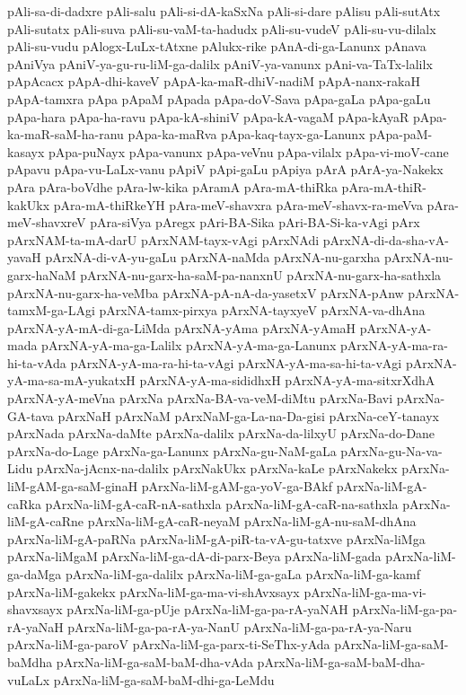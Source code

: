{pAli-sa-di-dadxre
pAli-salu
pAli-si-dA-kaSxNa
pAli-si-dare
pAlisu
pAli-sutAtx
pAli-sutatx
pAli-suva
pAli-su-vaM-ta-hadudx
pAli-su-vudeV
pAli-su-vu-dilalx
pAli-su-vudu
pAlogx-LuLx-tAtxne
pAlukx-rike
pAnA-di-ga-Lanunx
pAnava
pAniVya
pAniV-ya-gu-ru-liM-ga-dalilx
pAniV-ya-vanunx
pAni-va-TaTx-lalilx
pApAcacx
pApA-dhi-kaveV
pApA-ka-maR-dhiV-nadiM
pApA-nanx-rakaH
pApA-tamxra
pApa
pApaM
pApada
pApa-doV-Sava
pApa-gaLa
pApa-gaLu
pApa-hara
pApa-ha-ravu
pApa-kA-shiniV
pApa-kA-vagaM
pApa-kAyaR
pApa-ka-maR-saM-ha-ranu
pApa-ka-maRva
pApa-kaq-tayx-ga-Lanunx
pApa-paM-kasayx
pApa-puNayx
pApa-vanunx
pApa-veVnu
pApa-vilalx
pApa-vi-moV-cane
pApavu
pApa-vu-LaLx-vanu
pApiV
pApi-gaLu
pApiya
pArA
pArA-ya-Nakekx
pAra
pAra-boVdhe
pAra-lw-kika
pAramA
pAra-mA-thiRka
pAra-mA-thiR-kakUkx
pAra-mA-thiRkeYH
pAra-meV-shavxra
pAra-meV-shavx-ra-meVva
pAra-meV-shavxreV
pAra-siVya
pAregx
pAri-BA-Sika
pAri-BA-Si-ka-vAgi
pArx
pArxNAM-ta-mA-darU
pArxNAM-tayx-vAgi
pArxNAdi
pArxNA-di-da-sha-vA-yavaH
pArxNA-di-vA-yu-gaLu
pArxNA-naMda
pArxNA-nu-garxha
pArxNA-nu-garx-haNaM
pArxNA-nu-garx-ha-saM-pa-nanxnU
pArxNA-nu-garx-ha-sathxla
pArxNA-nu-garx-ha-veMba
pArxNA-pA-nA-da-yasetxV
pArxNA-pAnw
pArxNA-tamxM-ga-LAgi
pArxNA-tamx-pirxya
pArxNA-tayxyeV
pArxNA-va-dhAna
pArxNA-yA-mA-di-ga-LiMda
pArxNA-yAma
pArxNA-yAmaH
pArxNA-yA-mada
pArxNA-yA-ma-ga-Lalilx
pArxNA-yA-ma-ga-Lanunx
pArxNA-yA-ma-ra-hi-ta-vAda
pArxNA-yA-ma-ra-hi-ta-vAgi
pArxNA-yA-ma-sa-hi-ta-vAgi
pArxNA-yA-ma-sa-mA-yukatxH
pArxNA-yA-ma-sididhxH
pArxNA-yA-ma-sitxrXdhA
pArxNA-yA-meVna
pArxNa
pArxNa-BA-va-veM-diMtu
pArxNa-Bavi
pArxNa-GA-tava
pArxNaH
pArxNaM
pArxNaM-ga-La-na-Da-gisi
pArxNa-ceY-tanayx
pArxNada
pArxNa-daMte
pArxNa-dalilx
pArxNa-da-lilxyU
pArxNa-do-Dane
pArxNa-do-Lage
pArxNa-ga-Lanunx
pArxNa-gu-NaM-gaLa
pArxNa-gu-Na-va-Lidu
pArxNa-jAcnx-na-dalilx
pArxNakUkx
pArxNa-kaLe
pArxNakekx
pArxNa-liM-gAM-ga-saM-ginaH
pArxNa-liM-gAM-ga-yoV-ga-BAkf
pArxNa-liM-gA-caRka
pArxNa-liM-gA-caR-nA-sathxla
pArxNa-liM-gA-caR-na-sathxla
pArxNa-liM-gA-caRne
pArxNa-liM-gA-caR-neyaM
pArxNa-liM-gA-nu-saM-dhAna
pArxNa-liM-gA-paRNa
pArxNa-liM-gA-piR-ta-vA-gu-tatxve
pArxNa-liMga
pArxNa-liMgaM
pArxNa-liM-ga-dA-di-parx-Beya
pArxNa-liM-gada
pArxNa-liM-ga-daMga
pArxNa-liM-ga-dalilx
pArxNa-liM-ga-gaLa
pArxNa-liM-ga-kamf
pArxNa-liM-gakekx
pArxNa-liM-ga-ma-vi-shAvxsayx
pArxNa-liM-ga-ma-vi-shavxsayx
pArxNa-liM-ga-pUje
pArxNa-liM-ga-pa-rA-yaNAH
pArxNa-liM-ga-pa-rA-yaNaH
pArxNa-liM-ga-pa-rA-ya-NanU
pArxNa-liM-ga-pa-rA-ya-Naru
pArxNa-liM-ga-paroV
pArxNa-liM-ga-parx-ti-SeThx-yAda
pArxNa-liM-ga-saM-baMdha
pArxNa-liM-ga-saM-baM-dha-vAda
pArxNa-liM-ga-saM-baM-dha-vuLaLx
pArxNa-liM-ga-saM-baM-dhi-ga-LeMdu
}

